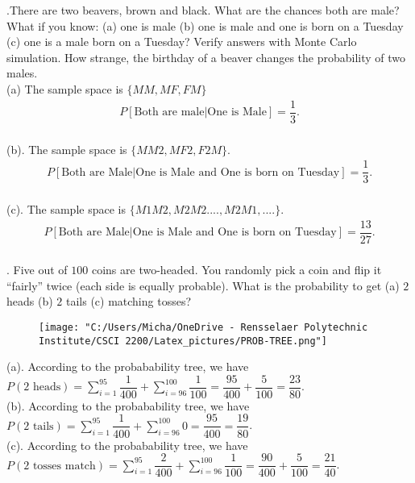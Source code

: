 \documentclass{article}
\begin{document}
\begin{addmargin}[2em]{2em}
	.There are two beavers, brown and black. What are the chances both are male? What if you know:
	(a) one is male (b) one is male and one is born on a Tuesday (c) one is a male born on a Tuesday?
	Verify answers with Monte Carlo simulation. How strange, the birthday of a beaver changes the probability of two males.\\
	
	(a)
	The sample space is $\{MM,MF,FM\}$
	\begin{align*}
		P[\text{Both are male}|\text{One is Male}] = \dfrac{1}{3}.\\
	\end{align*}

	(b).
	The sample space is $\{MM2,MF2,F2M\}$.
	\begin{align*}
		P[\text{Both are Male}|\text{One is Male and One is born on Tuesday}] = \dfrac{1}{3}.\\
	\end{align*}

	(c).
	The sample space is $\{M1M2,M2M2....,M2M1,....\}$.
	\begin{align*}
		P[\text{Both are Male}|\text{One is Male and One is born on Tuesday}] = \dfrac{13}{27}.\\
	\end{align*}
\end{addmargin}


\clearpage

\begin{addmargin}[2em]{2em}
	. Five out of $100$ coins are two-headed. You randomly pick a coin and flip it “fairly” twice (each side
	is equally probable). What is the probability to get (a) $2$ heads (b) $2$ tails (c) matching tosses?
	
	\begin{figure}[ht]
		\texttt{[image: "C:/Users/Micha/OneDrive - Rensselaer Polytechnic Institute/CSCI 2200/Latex\_pictures/PROB-TREE.png"]}
	\end{figure}
	(a). According to the probabability tree, we have $P(\text{2 heads}) = \sum_{i=1}^{95} \dfrac{1}{400} + \sum_{i=96}^{100} \dfrac{1}{100} = \dfrac{95}{400}+\dfrac{5}{100} = \dfrac{23}{80}$.\\
	
	(b). According to the probabability tree, we have $P(\text{2 tails}) = \sum_{i=1}^{95} \dfrac{1}{400} + \sum_{i=96}^{100} 0 = \dfrac{95}{400} =  \dfrac{19}{80}$.\\
	
	(c). According to the probabability tree, we have $P(\text{2 tosses match}) = \sum_{i=1}^{95} \dfrac{2}{400} + \sum_{i=96}^{100} \dfrac{1}{100} = \dfrac{90}{400}+\dfrac{5}{100} = \dfrac{21}{40}$.
\end{addmargin}
\end{document}
